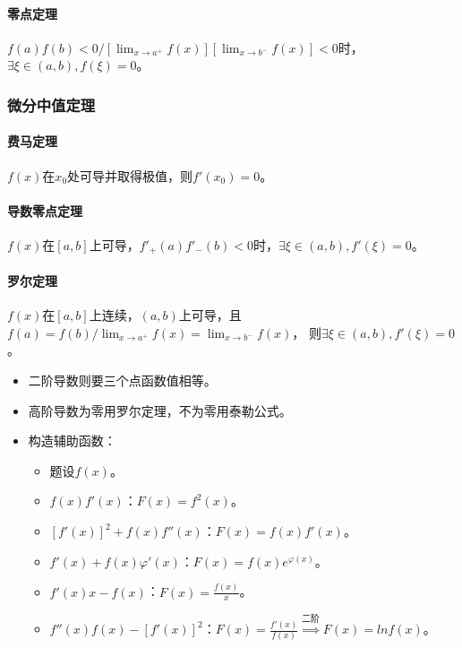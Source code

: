 \documentclass[
12pt, %
a4paper, 
oneside, %
headinclude,footinclude, %
]{scrartcl}
\begin{document}
\paragraph{零点定理}
$ f(a)f(b) < 0 / [\lim_{x \to a^+} f(x)][\lim_{x \to b^-} f(x)] < 0 $时，$ \exists \xi \in (a, b), f(\xi) = 0 $。
\subsubsection{微分中值定理}
\paragraph{费马定理}
$ f(x) $在$ x_0 $处可导并取得极值，则$ f'(x_0) = 0 $。
\paragraph{导数零点定理}
$ f(x) $在$ [a, b] $上可导，$ f'_+(a)f'_-(b) < 0 $时，$ \exists \xi \in (a, b), f'(\xi) = 0 $。
\paragraph{罗尔定理}
$ f(x) $在$ [a, b] $上连续，$ (a, b) $上可导，且$ f(a) = f(b) / \lim_{x \to a^+} f(x) = \lim_{x \to b^-} f(x) $，
则$ \exists \xi \in (a, b), f'(\xi) = 0 $。
\begin{itemize}
\item 二阶导数则要三个点函数值相等。
\item 高阶导数为零用罗尔定理，不为零用泰勒公式。
\item 构造辅助函数：
\begin{itemize}
\item 题设$ f(x) $。
\item $ f(x)f'(x) $：$ F(x) = f^2(x) $。
\item $ [f'(x)]^2 + f(x)f''(x) $：$ F(x) = f(x)f'(x) $。
\item $ f'(x) + f(x)\varphi'(x) $：$ F(x) = f(x)e^{\varphi(x)} $。
\item $ f'(x)x - f(x) $：$ F(x) = \frac{f(x)}{x} $。
\item $ f''(x)f(x) - [f'(x)]^2 $：$ F(x) = \frac{f'(x)}{f(x)} $$ \overset{\text{二阶}}{\Longrightarrow} $$ F(x) = ln f(x) $。
\end{itemize}
\end{itemize}
\end{document}
